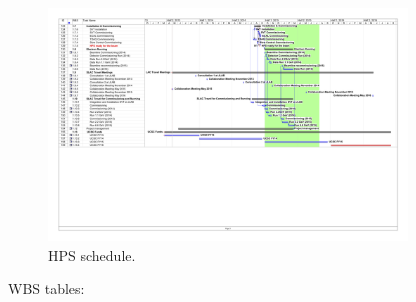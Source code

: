 \begin{figure}[ht]
\centering
\includegraphics*[angle=90,width=0.85\textwidth]{cost_schedule/ScheduleHPSV470-3.jpg} 
\caption{HPS schedule.}
\label{fig:schedulec}
\end{figure}


\clearpage
WBS tables:



